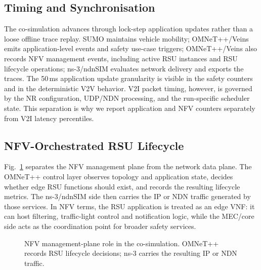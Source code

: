\documentclass[journal]{IEEEtran}
\begin{document}
\subsection{Timing and Synchronisation}

The co-simulation advances through lock-step application updates rather than a loose offline trace replay. SUMO maintains vehicle mobility; OMNeT++/Veins emits application-level events and safety use-case triggers; OMNeT++/Veins also records NFV management events, including active RSU instances and RSU lifecycle operations; ns-3/ndnSIM evaluates network delivery and exports the traces. The 50\,ms application update granularity is visible in the safety counters and in the deterministic V2V behavior. V2I packet timing, however, is governed by the NR configuration, UDP/NDN processing, and the run-specific scheduler state. This separation is why we report application and NFV counters separately from V2I latency percentiles.

\subsection{NFV-Orchestrated RSU Lifecycle}

Fig.~\ref{fig:nfvplane} separates the NFV management plane from the network data plane. The OMNeT++ control layer observes topology and application state, decides whether edge RSU functions should exist, and records the resulting lifecycle metrics. The ns-3/ndnSIM side then carries the IP or NDN traffic generated by those services. In NFV terms, the RSU application is treated as an edge VNF: it can host filtering, traffic-light control and notification logic, while the MEC/core side acts as the coordination point for broader safety services.

\begin{figure}[!t]\centering
{}
\caption{NFV management-plane role in the co-simulation. OMNeT++ records RSU lifecycle decisions; ns-3 carries the resulting IP or NDN traffic.}
\label{fig:nfvplane}
\end{figure}
\end{document}
